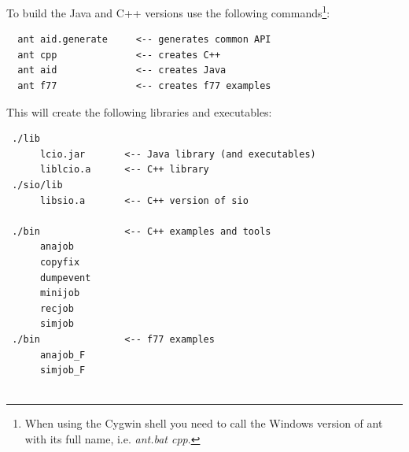 \documentclass[twoside]{article}
\begin{document}





To build the Java and C++ versions use the following commands\footnote{When using the Cygwin shell you need to
call the Windows version of ant with its full name, i.e. {\em ant.bat cpp}.}:
\begin{verbatim}
  ant aid.generate     <-- generates common API
  ant cpp              <-- creates C++
  ant aid              <-- creates Java  
  ant f77              <-- creates f77 examples
\end{verbatim}

This will create the following libraries and executables:

\begin{verbatim}
 ./lib
      lcio.jar       <-- Java library (and executables)
      liblcio.a      <-- C++ library
 ./sio/lib
      libsio.a       <-- C++ version of sio 

 ./bin               <-- C++ examples and tools
      anajob
      copyfix
      dumpevent
      minijob
      recjob
      simjob
 ./bin               <-- f77 examples
      anajob_F
      simjob_F
      
\end{verbatim}
\end{document}
